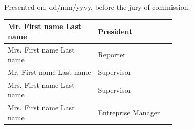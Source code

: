 \begin{titlepage}
\begin{center}
\vspace{40pt}
Presented on: dd/mm/yyyy, before the jury of commission: \\
\vspace{20pt}
\begin{tabular}{|p{0.35\linewidth}| p{0.3\linewidth}|}
\hline
  Mr. First name Last name & President \\ \hline
  Mrs. First name Last name& Reporter\\ \hline
  Mr. First name Last name & Supervisor\\ \hline
  Mrs. First name Last name & Supervisor\\ \hline
  Mrs. First name Last name& Entreprise Manager\\ \hline
\end{tabular}


\vfill

\end{center}
\end{titlepage}